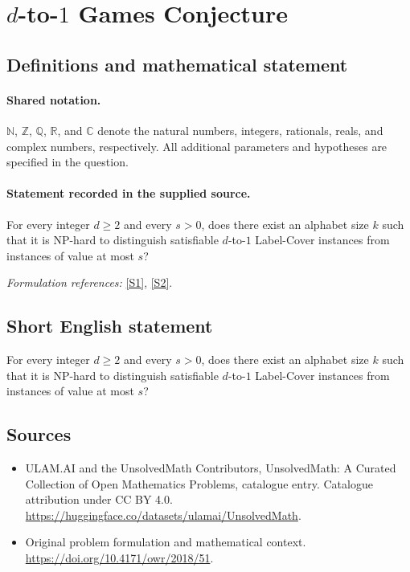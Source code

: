 \documentclass[11pt]{article}
\newcommand{\sref}[2]{\hyperlink{source:#1:#2}{[S#2]}}
\begin{document}
\section{\texorpdfstring{$d$-to-$1$ Games Conjecture}{d-to-1 Games Conjecture}}\label{statement}

\subsection{Definitions and mathematical statement}

\paragraph{Shared notation.}$\mathbb N$, $\mathbb Z$, $\mathbb Q$, $\mathbb R$, and $\mathbb C$ denote the natural numbers, integers, rationals, reals, and complex numbers, respectively. All additional parameters and hypotheses are specified in the question.


\paragraph{Statement recorded in the supplied source.}
For every integer $d\geq2$ and every $s>0$, does there exist an alphabet size $k$ such that it is NP-hard to distinguish satisfiable $d$-to-$1$ Label-Cover instances from instances of value at most $s$?
\par\smallskip\textit{Formulation references:} \sref{statement}{1}, \sref{statement}{2}.
\subsection{Short English statement}
For every integer $d\geq2$ and every $s>0$, does there exist an alphabet size $k$ such that it is NP-hard to distinguish satisfiable $d$-to-$1$ Label-Cover instances from instances of value at most $s$?
\subsection{Sources}
\begin{itemize}
\item[\hypertarget{source:statement:1}{S1}] ULAM.AI and the UnsolvedMath Contributors, UnsolvedMath: A Curated Collection of Open Mathematics Problems, catalogue entry. Catalogue attribution under CC BY 4.0.
\url{https://huggingface.co/datasets/ulamai/UnsolvedMath}.
\item[\hypertarget{source:statement:2}{S2}] Original problem formulation and mathematical context.
\url{https://doi.org/10.4171/owr/2018/51}.
\end{itemize}
\label{end:statement}
\end{document}

